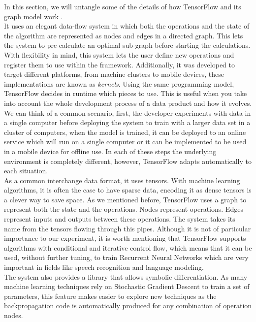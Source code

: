 In this section, we will untangle some of the details of how TensorFlow and its graph model work \cite{DBLP:journals/corr/AbadiBCCDDDGIIK16}.\\

It uses an elegant data-flow system in which both the operations and the state of the algorithm are represented as nodes and edges in a directed graph. This lets the system to pre-calculate an optimal sub-graph before starting the calculations.\\

With flexibility in mind, this system lets the user define new operations and register them to use within the framework. Additionally, it was developed to target different platforms, from machine clusters to mobile devices, these implementations are known as \textit{kernels}. Using the same programming model, TensorFlow decides in runtime which pieces to use. This is useful when you take into account the whole development process of a data product and how it evolves. We can think of a common scenario, first, the developer experiments with data in a single computer before deploying the system to train with a larger data set in a cluster of computers, when the model is trained, it can be deployed to an online service which will run on a single computer or it can be implemented to be used in a mobile device for offline use. In each of these steps the underlying environment is completely different, however, TensorFlow adapts automatically to each situation.\\


As a common interchange data format, it uses tensors. With machine learning algorithms, it is often the case to have sparse data, encoding it as dense tensors is a clever way to save space. As we mentioned before, TensorFlow uses a graph to represent both the state and the operations. Nodes represent operations. Edges represent inputs and outputs between these operations. The system takes its name from the tensors flowing through this pipes. Although it is not of particular importance to our experiment, it is worth mentioning that TensorFlow supports algorithms with conditional and iterative control flow, which means that it can be used, without further tuning, to train Recurrent Neural Networks which are very important in fields like speech recognition and language modeling.\\

The system also provides a library that allows symbolic differentiation. As many machine learning techniques rely on Stochastic Gradient Descent to train a set of parameters, this feature makes easier to explore new techniques as the backpropagation code is automatically produced for any combination of operation nodes.\\

